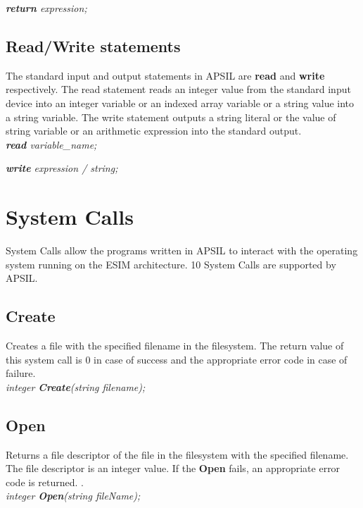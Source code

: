 \textit{\textbf{return} expression;}


\subsection{Read/Write statements}
The standard input and output statements in APSIL are \textbf{read} and \textbf{write} respectively. The read statement reads an integer value from the standard input device into an integer variable or an indexed array variable or a string value into a string variable. The write statement outputs a string literal or the value of string variable or an arithmetic expression  into the standard output.\\

\textit{\textbf{read} variable\_name;}

\textit{\textbf{write} expression / string;}






\section{System Calls}

System Calls allow the programs written in APSIL to interact with the operating system running on the ESIM architecture. 10 System Calls are supported by APSIL. 




\subsection{Create}
Creates a file with the specified filename in the filesystem. The return value of this system call is 0 in case of success and the appropriate error code in case of failure.
\\

\textit{integer \textbf{Create}(string filename);}






\subsection{Open}
Returns a file descriptor of the file in the filesystem with the specified filename. The file descriptor is an integer value. If the \textbf{Open} fails, an appropriate error code is returned.
.\\

\textit{integer \textbf{Open}(string fileName);}





